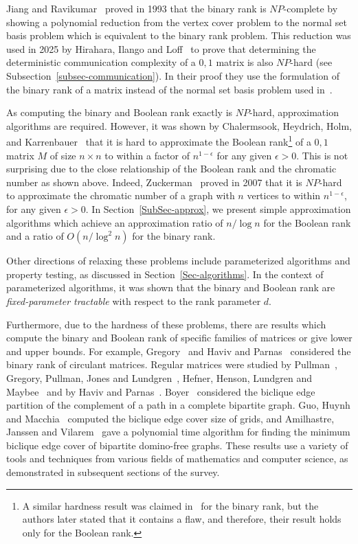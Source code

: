 \documentclass[11pt]{article}
\begin{document}
Jiang and Ravikumar~\cite{jiang1993minimal} proved in 1993 that the binary rank is $NP$-complete by showing a polynomial reduction from the vertex cover problem
to the normal set basis problem which is equivalent to the binary rank problem.
This reduction was used in 2025 by Hirahara,  Ilango  and Loff~\cite{hirahara2025communication} to prove
that determining  the deterministic communication complexity  of a $0,1$ matrix is also $NP$-hard (see Subsection~\ref{subsec-communication}).
In their proof they use the formulation of the binary rank of a matrix instead of the normal set basis problem used in~\cite{jiang1993minimal}.

As computing the binary and Boolean rank exactly is $NP$-hard, approximation algorithms are required.
However, it was shown by Chalermsook,  Heydrich,  Holm, and  Karrenbauer~\cite{chalermsook2014nearly} that it is hard to approximate the
Boolean rank\footnote{A similar hardness result was claimed in~\cite{chalermsook2014nearly} for the binary rank,
but the authors later stated that it contains a flaw, and therefore, their result holds only for the Boolean rank.} of a $0,1$ matrix $M$ of size $n \times n$  to within a
factor of $n^{1 - \epsilon}$ for any given $\epsilon > 0$. This is not surprising due to the close relationship of the Boolean rank and the chromatic number
as shown above. Indeed, Zuckerman~\cite{zuckerman2007linear} proved in 2007 that it is $NP$-hard to approximate the chromatic number of a graph with $n$ vertices
to within $n^{1 - \epsilon}$, for any given $\epsilon > 0$.
In Section~\ref{SubSec-approx}, we present simple approximation algorithms  which achieve an approximation ratio of $n /\log n$ for the Boolean rank and a ratio of $O(n /\log^2 n)$ for the binary rank.

Other directions of relaxing these problems include parameterized algorithms and property testing, as discussed in Section~\ref{Sec-algorithms}.
In the context of parameterized algorithms, it was shown that the binary and Boolean rank are {\em fixed-parameter tractable} with respect to the rank parameter $d$.

Furthermore, due to the hardness of these problems, there are results which compute the binary and Boolean rank of specific families of matrices or give lower and upper bounds.
For example,  Gregory~\cite{gregory1989biclique} and Haviv and Parnas~\cite{haviv2023binary} considered the binary rank of circulant matrices.
Regular matrices were studied by Pullman~\cite{Pullman88}, Gregory, Pullman, Jones and  Lundgren~\cite{Gregory}, Hefner,  Henson,  Lundgren and  Maybee~\cite{HefnerHLM90} and
by Haviv and Parnas~\cite{haviv2022mfcs, haviv2023binary}.
Boyer~\cite{boyer1998rank} considered the biclique edge partition of the complement of a path in a complete bipartite graph.
Guo, Huynh and Macchia~\cite{guo2018biclique} computed the biclique edge cover size of grids,
and Amilhastre,  Janssen and Vilarem~\cite{AMILHASTRE1998125} gave a polynomial time algorithm for finding the minimum biclique edge cover of bipartite domino-free graphs.
These results use a variety of tools and techniques from various fields of mathematics and computer science, as  demonstrated in subsequent sections of the survey.
\end{document}
